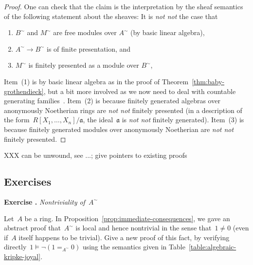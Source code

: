 \documentclass{ws-rv9x6}
\newlength{\exerciseskip}
\newcounter{exercisenr}
\newenvironment{exercise}[1]{
  \refstepcounter{exercisenr}
  \noindent\textbf{Exercise \theexercisenr{}.} \emph{#1} \smallskip\par\noindent%
}{\par\vspace{\exerciseskip}}
\newcommand{\aaa}{\mathfrak{a}}
\renewcommand{\_}{\mathpunct{.}}
\newcommand{\?}{\,{:}\,}
\newcommand{\notnot}{\emph{not not}\xspace}
\begin{document}
\begin{proof}One can check that the claim is the interpretation by the sheaf
semantics of the following statement about the sheaves: It is \notnot the case that
\begin{enumerate}
  \item $B^\sim$ and $M^\sim$ are free modules over $A^\sim$ (by basic linear algebra),
  \item $A^\sim \to B^\sim$ is of finite presentation, and
  \item $M^\sim$ is finitely presented as a module over $B^\sim$,
\end{enumerate}

Item~(1) is by basic linear algebra as in the proof of
Theorem~\ref{thm:baby-grothendieck}, but a bit more involved as we now need to
deal with countable generating
families~\cite[Theorem~11.16]{blechschmidt:phd}. Item~(2) is because finitely
generated algebras over anonymously Noetherian rings are \notnot finitely
presented (in a description of the form~$R[X_1,\ldots,X_n]/\aaa$, the
ideal~$\aaa$ is \notnot finitely generated).
Item~(3) is because finitely generated modules over anonymously Noetherian are
\notnot finitely presented.
\end{proof}

XXX can be unwound, see ...; give pointers to existing proofs


\subsection{Exercises}

\begin{exercise}{Nontriviality of~$A^\sim$}%
Let~$A$ be a ring. In Proposition~\ref{prop:immediate-consequences}, we gave an
abstract proof that~$A^\sim$ is local and hence nontrivial in the sense that~$1
\neq 0$ (even if~$A$ itself happens to be trivial). Give a new proof of this
fact, by verifying directly~$1 \models \neg(1 =_{A^\sim} 0)$ using the
semantics given in Table~\ref{table:algebraic-kripke-joyal}.
\end{exercise}
\end{document}
